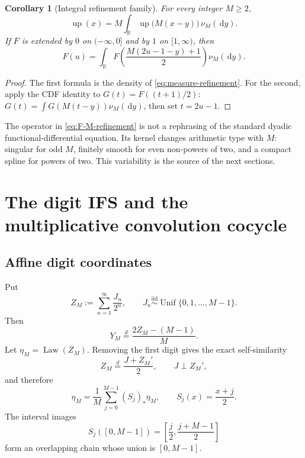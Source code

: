 \documentclass[11pt,oneside]{article}
\newtheorem{corollary}[theorem]{Corollary}
\theoremstyle{definition}
\theoremstyle{remark}
\newcommand{\R}{\mathbb R}
\newcommand{\Up}{\operatorname{up}}
\newcommand{\dd}{\,\mathrm d}
\numberwithin{equation}{section}
\newcommand{\Law}{\operatorname{Law}}
\newcommand{\1}{\mathbf 1}
\begin{document}
\begin{corollary}[Integral refinement family]
\label{cor:Up-refinement}
For every integer $M\ge2$,
\begin{equation}
 \Up(x)=M\int_{\R}\Up\bigl(M(x-y)\bigr)\,\nu_M(\dd y).
 \label{eq:Up-M-refinement}
\end{equation}
If $F$ is extended by $0$ on $(-\infty,0]$ and by $1$ on $[1,\infty)$, then
\begin{equation}
 F(u)=\int_{\R}
 F\!\left(\frac{M(2u-1-y)+1}{2}\right)\nu_M(\dd y).
 \label{eq:F-M-refinement}
\end{equation}
\end{corollary}

\begin{proof}
The first formula is the density of \eqref{eq:measure-refinement}.  For the second, apply
the CDF identity to $G(t)=F((t+1)/2)$:
$G(t)=\int G(M(t-y))\nu_M(\dd y)$, then set $t=2u-1$.
\end{proof}

The operator in \eqref{eq:F-M-refinement} is not a rephrasing of the standard dyadic
functional-differential equation.  Its kernel changes arithmetic type with $M$: singular for
odd $M$, finitely smooth for even non-powers of two, and a compact spline for powers of two.
This variability is the source of the next sections.

\section{The digit IFS and the multiplicative convolution cocycle}
\label{sec:digit-ifs}

\subsection{Affine digit coordinates}

Put
\begin{equation}
 Z_M:=\sum_{n=1}^{\infty}\frac{J_n}{2^n},
 \qquad
 J_n\overset{\mathrm{iid}}\sim\operatorname{Unif}\{0,1,\ldots,M-1\}.
 \label{eq:ZM}
\end{equation}
Then
\begin{equation}
 Y_M\overset d=\frac{2Z_M-(M-1)}{M}.
 \label{eq:Y-Z-affine}
\end{equation}
Let $\eta_M=\Law(Z_M)$.  Removing the first digit gives the exact self-similarity
\begin{equation}
 Z_M\overset d=\frac{J+Z_M'}2,
 \qquad J\perp Z_M',
 \label{eq:Z-IFS-random}
\end{equation}
and therefore
\begin{equation}
 \eta_M=\frac1M\sum_{j=0}^{M-1}(S_j)_*\eta_M,
 \qquad S_j(x)=\frac{x+j}{2}.
 \label{eq:eta-IFS}
\end{equation}
The interval images
\[
 S_j([0,M-1])=\left[\frac j2,\frac{j+M-1}{2}\right]
\]
form an overlapping chain whose union is $[0,M-1]$.
\end{document}
